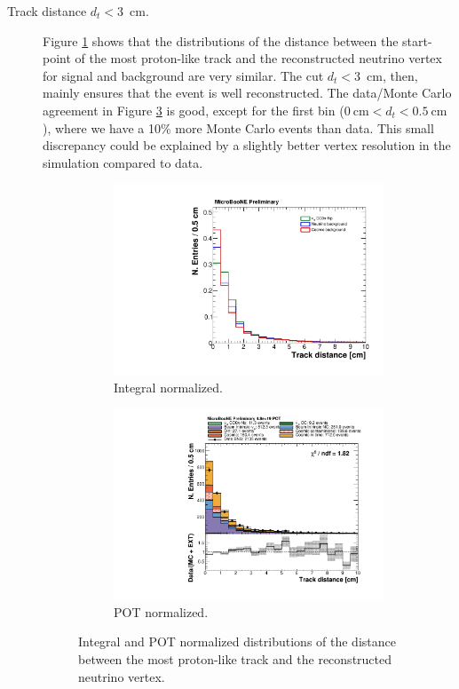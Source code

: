 \begin{description}
\item[Track distance $d_{t} < 3$~cm.] Figure \ref{fig:track_norm} shows that the distributions of the distance between the start-point of the most proton-like track and the reconstructed neutrino vertex for signal and background are very similar. The cut $d_{t} < 3$~cm, then, mainly ensures that the event is well reconstructed. The data/Monte Carlo agreement in Figure \ref{fig:track_pot} is good, except for the first bin ($0~\mathrm{cm} < d_{t} < 0.5~\mathrm{cm}$), where we have a 10\% more Monte Carlo events than data. This small discrepancy could be explained by a slightly better vertex resolution in the simulation compared to data.

\begin{figure}[htbp]
\centering
  \begin{subfigure}{0.45\textwidth}
    \includegraphics[width=\linewidth]{figures/h_track_distance_norm.pdf}
    \caption{Integral normalized.} \label{fig:track_norm}
  \end{subfigure}
    \begin{subfigure}{0.45\textwidth}
    \includegraphics[width=\linewidth]{figures/h_track_distance.pdf}
    \caption{POT normalized.} \label{fig:track_pot}
  \end{subfigure}
  \caption{Integral and POT normalized distributions of the distance between the most proton-like track and the reconstructed neutrino vertex.}
\end{figure}


\end{description}
